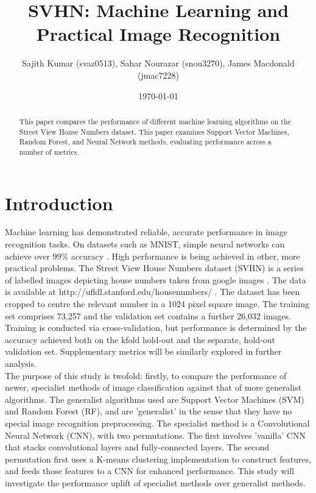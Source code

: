 \documentclass[12pt]{article}
\title{SVHN: Machine Learning and Practical Image Recognition}
\author{Sajith Kumar (svaz0513), Sahar Nourazar (snou3270), James Macdonald (jmac7228)}
\date{\today}
\begin{document}
\maketitle
\thispagestyle{empty}

\begin{abstract}
This paper compares the performance of different machine learning algorithms on the Street View House Numbers dataset. This paper examines Support Vector Machines, Random Forest, and Neural Network methods, evaluating performance across a number of metrics.
\end{abstract}

\section{Introduction}
 
Machine learning has demonstrated reliable, accurate performance in image recognition tasks. On datasets such as MNIST, simple neural networks can achieve over 99\% accuracy \citep{tfmnist}. High performance is being achieved in other, more practical problems. The Street View House Numbers dataset (SVHN) is a series of labelled images depicting house numbers taken from google images \citep{svhn}. The data is available at http://ufldl.stanford.edu/housenumbers/ . The dataset has been cropped to centre the relevant number in a 1024 pixel square image. The training set comprises 73,257 and the validation set contains a further 26,032 images. Training is conducted via cross-validation, but performance is determined by the accuracy achieved both on the kfold hold-out and the separate, hold-out validation set. Supplementary metrics will be similarly explored in further analysis.\\

The purpose of this study is twofold: firstly, to compare the performance of newer, specialist methods of image classification against that of more generalist algorithms. The generalist algorithms used are Support Vector Machines (SVM) and Random Forest (RF), and are 'generalist' in the sense that they have no special image recognition preprocessing. The specialist method is a Convolutional Neural Network (CNN), with two permutations. The first involves 'vanilla' CNN that stacks convolutional layers and fully-connected layers. The second permutation first uses a K-means clustering implementation to construct features, and feeds those features to a CNN for enhanced performance. This study will investigate the performance uplift of specialist methods over generalist methods.\\
\end{document}
